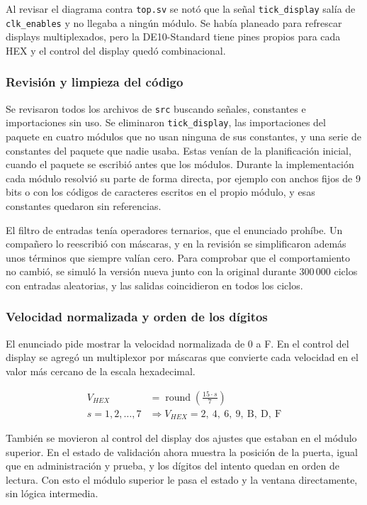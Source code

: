\documentclass[11pt,letterpaper]{article}
\begin{document}
Al revisar el diagrama contra \texttt{top.sv} se notó que la señal \texttt{tick\_display} salía de \texttt{clk\_enables} y no llegaba a ningún módulo. Se había planeado para refrescar displays multiplexados, pero la DE10-Standard tiene pines propios para cada HEX y el control del display quedó combinacional.

\subsubsection*{Revisión y limpieza del código}

Se revisaron todos los archivos de \texttt{src} buscando señales, constantes e importaciones sin uso. Se eliminaron \texttt{tick\_display}, las importaciones del paquete en cuatro módulos que no usan ninguna de sus constantes, y una serie de constantes del paquete que nadie usaba. Estas venían de la planificación inicial, cuando el paquete se escribió antes que los módulos. Durante la implementación cada módulo resolvió su parte de forma directa, por ejemplo con anchos fijos de 9 bits o con los códigos de caracteres escritos en el propio módulo, y esas constantes quedaron sin referencias.

El filtro de entradas tenía operadores ternarios, que el enunciado prohíbe. Un compañero lo reescribió con máscaras, y en la revisión se simplificaron además unos términos que siempre valían cero. Para comprobar que el comportamiento no cambió, se simuló la versión nueva junto con la original durante 300\,000 ciclos con entradas aleatorias, y las salidas coincidieron en todos los ciclos.

\subsubsection*{Velocidad normalizada y orden de los dígitos}

El enunciado pide mostrar la velocidad normalizada de 0 a F. En el control del display se agregó un multiplexor por máscaras que convierte cada velocidad en el valor más cercano de la escala hexadecimal.

\begin{align*}
V_{HEX} &= \operatorname{round}\left(\frac{15 \cdot s}{7}\right) \\
s = 1, 2, \ldots, 7 &\Rightarrow V_{HEX} = 2,\ 4,\ 6,\ 9,\ \text{B},\ \text{D},\ \text{F}
\end{align*}

También se movieron al control del display dos ajustes que estaban en el módulo superior. En el estado de validación ahora muestra la posición de la puerta, igual que en administración y prueba, y los dígitos del intento quedan en orden de lectura. Con esto el módulo superior le pasa el estado y la ventana directamente, sin lógica intermedia.
\end{document}
